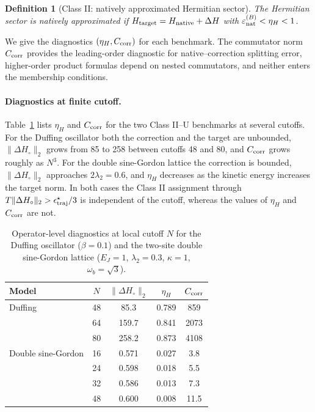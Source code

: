 \documentclass[pra,twocolumn,superscriptaddress,nofootinbib,floatfix]{revtex4-2}
\newtheorem{definition}{Definition}
\theoremstyle{remark}
\newcommand{\revcolor}{\color{blue}}
\DeclareRobustCommand{\rev}[1]{{\revcolor #1}}
\begin{document}
\begin{definition}[Class II: natively approximated Hermitian sector]
\label{def:class-II}
\rev{The Hermitian sector is \emph{natively approximated} if \(H_{\rm target}=H_{\rm native}+\Delta H\) with \(\varepsilon_{\rm nat}^{(B)}<\eta_H<1\).}
\end{definition}

\rev{We give the diagnostics \((\eta_H,C_{\rm corr})\) for each benchmark.} The commutator norm $C_{\rm corr}$ provides the leading-order diagnostic for native--correction splitting error, higher-order product formulas depend on nested commutators, and neither enters the membership conditions.

\paragraph{\rev{Diagnostics at finite cutoff.}}
\rev{Table~\ref{tab:class-diagnostics} lists \(\eta_H\) and \(C_{\rm corr}\) for the two Class II--U benchmarks at several cutoffs.} \rev{For the Duffing oscillator both the correction and the target are unbounded, \(\|\Delta H_\circ\|_2\) grows from 85 to 258 between cutoffs 48 and 80, and \(C_{\rm corr}\) grows roughly as \(N^3\).} \rev{For the double sine-Gordon lattice the correction is bounded, \(\|\Delta H_\circ\|_2\) approaches \(2\lambda_2=0.6\), and \(\eta_H\) decreases as the kinetic energy increases the target norm.} \rev{In both cases the Class II assignment through \(T\|\Delta H_\circ\|_2>\epsilon^\star_{\rm traj}/3\) is independent of the cutoff, whereas the values of \(\eta_H\) and \(C_{\rm corr}\) are not.}

\begin{table}[t]
\revcolor
\caption{Operator-level diagnostics at local cutoff \(N\) for the Duffing oscillator (\(\beta=0.1\)) and the two-site double sine-Gordon lattice (\(E_J=1\), \(\lambda_2=0.3\), \(\kappa=1\), \(\omega_b=\sqrt3\)).}
\label{tab:class-diagnostics}
\begin{ruledtabular}
\begin{tabular}{lcccc}
Model & \(N\) & \(\|\Delta H_\circ\|_2\) & \(\eta_H\) & \(C_{\rm corr}\) \\
\hline
Duffing & 48 & 85.3 & 0.789 & 859 \\
 & 64 & 159.7 & 0.841 & 2073 \\
 & 80 & 258.2 & 0.873 & 4108 \\
Double sine-Gordon & 16 & 0.571 & 0.027 & 3.8 \\
 & 24 & 0.598 & 0.018 & 5.5 \\
 & 32 & 0.586 & 0.013 & 7.3 \\
 & 48 & 0.600 & 0.008 & 11.5 \\
\end{tabular}
\end{ruledtabular}
\end{table}
\end{document}
